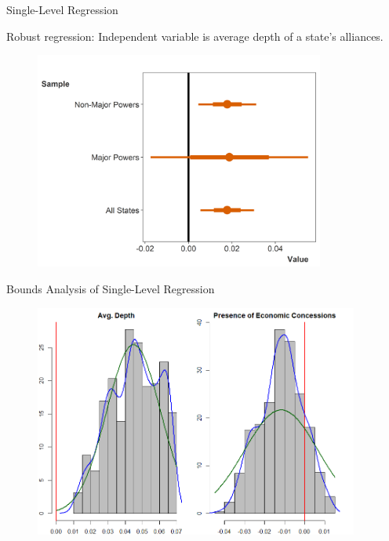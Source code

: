 \documentclass[12pt]{beamer}
\begin{document}
\begin{frame}{Single-Level Regression}

Robust regression: Independent variable is average depth of a state's alliances. 

\begin{figure}[htbp]
	\centering
		\includegraphics[width=0.85\textwidth]{robust-reg-coef.png}
\end{figure}


\end{frame}




\begin{frame}{Bounds Analysis of Single-Level Regression}

\begin{figure}[htbp]
	\centering
		\includegraphics[width=0.95\textwidth]{eba-single-level.png}
\end{figure}


\end{frame}









\end{document}
